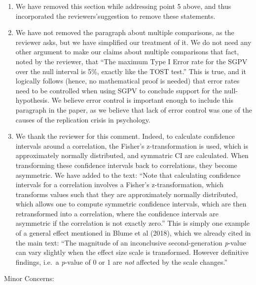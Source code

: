 \documentclass[man]{apa6}
\begin{document}
\begin{enumerate}
\def\labelenumi{\arabic{enumi}.}
\setcounter{enumi}{5}
\item
  We have removed this section while addressing point 5 above, and thus incorporated the reviewers'suggestion to remove these statements.
\item
  We have not removed the paragraph about multiple comparisons, as the reviewer asks, but we have simplified our treatment of it. We do not need any other argument to make our claims about multiple comparisons that fact, noted by the reviewer, that \enquote{The maximum Type I Error rate for the SGPV over the null interval is 5\%, exactly like the TOST test.} This is true, and it logically follows (hence, no mathematical proof is needed) that error rates need to be controlled when using SGPV to conclude support for the null-hypothesis. We believe error control is important enough to include this paragraph in the paper, as we believe that lack of error control was one of the causes of the replication crisis in psychology.
\item
  We thank the reviewer for this comment. Indeed, to calculate confidence intervals around a correlation, the Fisher's z-transformation is used, which is approximately normally distributed, and symmatric CI are calculated. When transforming these confidence intervals back to correlations, they become asymmetric. We have added to the text: \enquote{Note that calculating confidence intervals for a correlation involves a Fisher's z-transformation, which transforms values such that they are approximately normally distributed, which allows one to compute symmetric confidence intervals, which are then retransformed into a correlation, where the confidence intervals are asymmetric if the correlation is not exactly zero.} This is simply one example of a general effect mentioned in Blume et al (2018), which we already cited in the main text: \enquote{The magnitude of an inconclusive second-generation \emph{p}-value can vary slightly when the effect size scale is transformed. However definitive findings, i.e.~a \emph{p}-value of 0 or 1 are \emph{not} affected by the scale changes.}
\end{enumerate}

Minor Concerns:
\end{document}
